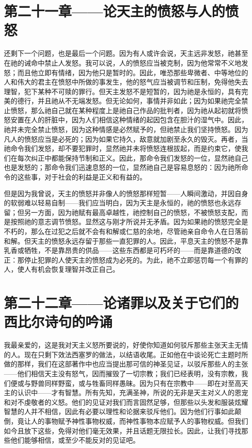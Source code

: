
\section{第二十一章——论天主的愤怒与人的愤怒}

还剩下一个问题，也是最后一个问题。因为有人或许会说，天主远非发怒，祂甚至在祂的诫命中禁止人发怒。我可以说，人的愤怒应当被克制，因为他常常不义地发怒；而且他立即有情绪，因为他只是暂时的。因此，唯恐那些卑微者、中等地位的人和伟大的君主在愤怒中所做的事发生，他的怒气应当被调节和压制，免得他失去理智，犯下某种不可赎的罪行。但天主发怒不是短暂的，因为祂是永恒的，具有完美的德行，并且祂从不无端发怒。但无论如何，事情并非如此；因为如果祂完全禁止愤怒，那么祂自己就在某种程度上是祂自己作品的批判者，因为祂从起初就将愤怒安置在人的肝脏中，因为人们相信这种情绪的起因包含在胆汁的湿气中。因此，祂并未完全禁止愤怒，因为这种情感是必然赋予的，但祂禁止我们坚持愤怒。因为凡人的愤怒应当是必死的；因为如果它持久，敌意就加剧至永久的毁灭。再者，当祂命令我们发怒，却不要犯罪时，显然祂并未将愤怒连根拔起，而是约束它，使我们在每次纠正中都能保持节制和正义。因此，那命令我们发怒的一位，显然祂自己也是发怒的；那命令我们迅速息怒的一位，显然祂自己是容易息怒的：因为祂所命令的这些事，对于社会的利益是正义和有益的。\par

但是因为我曾说，天主的愤怒并非像人的愤怒那样短暂——人瞬间激动，并因自身的软弱难以轻易自制——我们应当明白，因为天主是永恒的，祂的愤怒也永远存留；但另一方面，因为祂赋有最高卓越性，祂控制自己的愤怒，不被愤怒支配，而是按照祂的意志调节愤怒。显然这与刚才所说并无矛盾。因为如果祂的愤怒完全是不朽的，那么在过犯之后就不会有和解或仁慈的余地，尽管祂亲自命令人在日落前和解。但天主的愤怒永远存留于那些一直犯罪的人。因此，平息天主的愤怒不是靠乳香或牺牲，不是靠昂贵的供品——这些东西都是可朽坏的——而是靠道德的改正：那停止犯罪的人使天主的愤怒成为必死的。为此，祂不立即惩罚每一个有罪的人，使人有机会恢复理智并改正自己。\par


\section{第二十二章——论诸罪以及关于它们的西比尔诗句的吟诵}

我最亲爱的，这是我对天主义怒所要说的，好使你知道如何驳斥那些主张天主无情的人。现在只剩下效法西塞罗的做法，以结语收尾。正如他在中谈论死亡主题时所做的那样，我们在这部著作中也应当提出那可信的神圣见证，以驳斥那些人的主张——他们相信天主没有怒气，因而摧毁了一切宗教；我们已经表明，没有宗教，我们便或与野兽同样野蛮，或与牲畜同样愚昧。因为只有在宗教中——即在对至高天主的认识中——才有智慧。所有先知，充满圣神，所说的无非是天主对义人的恩宠和对不虔敬者的义怒。他们的见证对我们而言固然足够，但那些以头发和服装炫耀智慧的人并不相信，因此有必要以理性和论据来驳斥他们。因为他们行事如此颠倒，竟让人的事物赋予神性事物权威，而神性事物本应赋予人的事物权威。但我们如今且放下这些，免得对他们毫无效果，并且话题无限拉长。因此，让我们寻找那些他们能够相信，或至少不能反对的见证吧。\par

